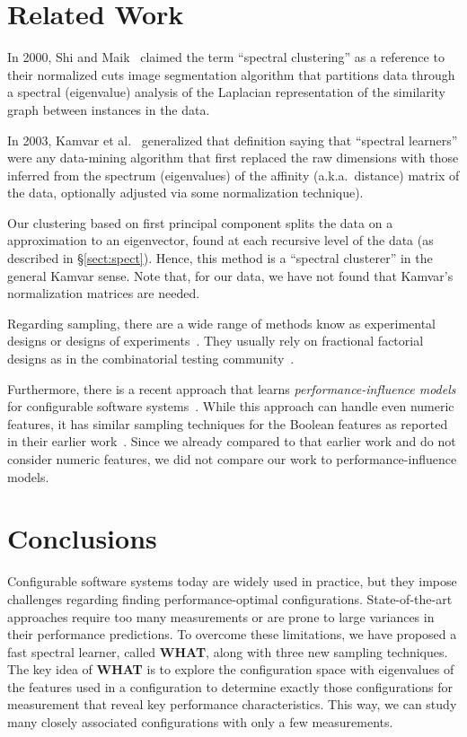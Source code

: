 \documentclass[smallextended]{svjour3}       %
\newcommand{\tion}[1]{\S\ref{sect:#1}}
\newcommand{\what}{{\bf WHAT}\xspace}
\begin{document}
\section{Related Work}
\label{sect:related}
 
In 2000, Shi and Maik~\cite{shi00} claimed the term ``spectral clustering'' as a reference to their normalized cuts
image
segmentation algorithm that  partitions data through a spectral (eigenvalue) analysis of the  
Laplacian representation of the similarity graph between instances in the data.

In 2003, Kamvar et al.~\cite{kamvar2003spectral}  generalized that definition saying that ``spectral learners''
were any data-mining algorithm that first replaced the raw
dimensions with those inferred from the spectrum (eigenvalues) of the affinity (a.k.a.\ distance)
matrix of the data, optionally adjusted via some normalization technique).

Our clustering based on first principal component splits the data on a   approximation to an eigenvector, found at each recursive level
of the data (as described in \tion{spect}). 
Hence, this  method is a ``spectral clusterer'' in the general Kamvar sense. 
Note that,
for our data, we have
not found that Kamvar's normalization matrices are needed.

Regarding sampling, there are a wide range of methods know as experimental designs or designs of experiments~\cite{pukelsheim2006optimal}. They usually rely on fractional factorial designs as in the combinatorial testing community~\cite{Kuhn:2013}. 

Furthermore, there is a recent approach that learns {\em per\-for\-mance-influence models} for configurable software systems~\cite{SGA+15}. While this approach can handle even numeric features, it has similar sampling techniques for the Boolean features as reported in their earlier work~\cite{siegmund2012predicting}. Since we already compared to that earlier work and do not consider numeric features, we did not compare our work to performance-influence models.
 



\section{Conclusions}

Configurable software systems today are widely used in practice, but they impose challenges
regarding finding performance-optimal configurations. State-of-the-art approaches require too
many measurements or are prone to large variances in their performance predictions. To overcome
these limitations, we have proposed a fast spectral learner, called \what,  along with three
new sampling techniques. The key idea of \what is to explore the configuration space with
eigenvalues of the features used in a configuration to determine exactly those configurations
for measurement that reveal key performance characteristics. 
This way, we can study many closely associated configurations with only a few measurements.
\end{document}

